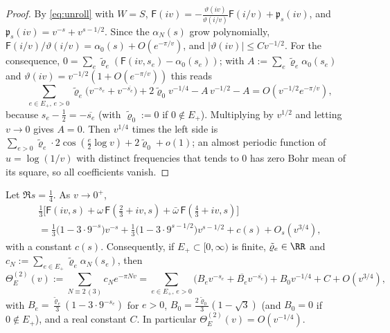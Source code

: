 \begin{proof}
By \eqref{eq:unroll} with $W=S$, $\mathsf F(iv)=-\frac{\vartheta(iv)}{\vartheta(i/v)}\mathsf F(i/v)+\mathfrak p_s(iv)$, and $\mathfrak p_s(iv)=v^{-s}+v^{s-1/2}$. Since
the $\alpha_N(s)$ grow polynomially, $\mathsf F(i/v)/\vartheta(i/v)=\alpha_0(s)+O(e^{-\pi/v})$, and $|\vartheta(iv)|\le Cv^{-1/2}$. For the consequence,
$0=\sum_e\tilde\varrho_e(\mathsf F(iv,s_e)-\alpha_0(s_e))$; with $A:=\sum_e\tilde\varrho_e\alpha_0(s_e)$ and $\vartheta(iv)=v^{-1/2}(1+O(e^{-\pi/v}))$ this reads
\[
\sum_{e\in E_+,\,e>0}\tilde\varrho_e\big(v^{-s_e}+v^{-\overline{s_e}}\big)+2\tilde\varrho_0v^{-1/4}-A\,v^{-1/2}-A=O(v^{-1/2}e^{-\pi/v}),
\]
because $s_e-\frac12=-\overline{s_e}$ (with $\tilde\varrho_0:=0$ if $0\notin E_+$). Multiplying by $v^{1/2}$ and letting $v\to0$ gives $A=0$. Then
$v^{1/4}$ times the left side is $\sum_{e>0}\tilde\varrho_e\cdot2\cos(\frac e2\log v)+2\tilde\varrho_0+o(1)$; an almost periodic function of
$u=\log(1/v)$ with distinct frequencies that tends to $0$ has zero Bohr mean of its square, so all coefficients vanish.
\end{proof}

\begin{lemma}\label{lem:cusp-class2}
Let $\Re s=\frac14$. As $v\to0^+$,
\begin{multline*}
\tfrac13\Big[\mathsf F(iv,s)+\omega\,\mathsf F(\tfrac23+iv,s)+\bar\omega\,\mathsf F(\tfrac43+iv,s)\Big]\\
=\tfrac13\big(1-3\cdot9^{-s}\big)v^{-s}+\tfrac13\big(1-3\cdot9^{s-1/2}\big)v^{s-1/2}+c(s)+O_s(v^{3/4}),
\end{multline*}
with a constant $c(s)$. Consequently, if $E_+\subset[0,\infty)$ is finite, $\tilde\varrho_e\in\RR$ and $c_N:=\sum_{e\in E_+}\tilde\varrho_e\alpha_N(s_e)$, then
\[
\Theta_E^{(2)}(v):=\sum_{N\equiv2\,(3)}c_Ne^{-\pi Nv}=\sum_{e\in E_+,\,e>0}\big(B_ev^{-s_e}+\overline{B_e}v^{-\overline{s_e}}\big)+B_0v^{-1/4}+C+O(v^{3/4}),
\]
with $B_e=\frac{\tilde\varrho_e}3(1-3\cdot9^{-s_e})$ for $e>0$, $B_0=\frac{2\tilde\varrho_0}3(1-\sqrt3)$ (and $B_0=0$ if $0\notin E_+$), and a real constant $C$. In
particular $\Theta_E^{(2)}(v)=O(v^{-1/4})$.
\end{lemma}

